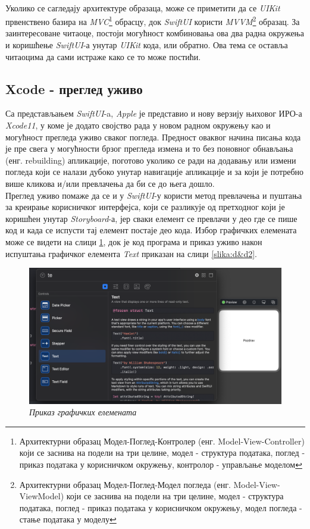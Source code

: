 \documentclass[12pt,oneside]{memoir}
\begin{document}
\\
\indent Уколико се сагледају архитектуре образаца, може се приметити да се \textit{UIKit} првенствено базира на \textit{MVC}\footnote{Архитектурни образац Модел-Поглед-Контролер (енг. Model-View-Controller) који се заснива на подели на три целине, модел - структура података, поглед - приказ података у корисничком окружењу, контролор - управљање моделом} обрасцу, док \textit{SwiftUI} користи \textit{MVVM}\footnote{Архитектурни образац Модел-Поглед-Модел погледа (енг. Model-View-ViewModel) који се заснива на подели на три целине, модел - структура података, поглед - приказ података у корисничком окружењу, модел погледа - стање података у моделу} образац. За заинтересоване читаоце, постоји могућност комбиновања ова два радна окружења и коришћење \textit{SwiftUI}-а унутар \textit{UIKit} кода, или обратно. Ова тема се оставља читаоцима да сами истраже како се то може постићи.

\subsection{Xcode - преглед уживо}
\label{subsec:Xcode - преглед уживо}

\indent Са представљањем \textit{SwiftUI}-a, \textit{Apple} је представио и нову верзију њиховог ИРО-а \textit{Xcode11}, у коме је додато својство рада у новом радном окружењу као и могућност прегледа уживо сваког погледа. Предност оваквог начина писања кода је пре свега у могућности брзог прегледа измена и то без поновног обнављања (енг. rebuilding) апликације, поготово уколико се ради на додавању или измени погледа који се налази дубоко унутар навигације апликације и за који је потребно више кликова и/или превлачења да би се до њега дошло. 
\\
\indent Преглед уживо помаже да се и у \textit{SwiftUI}-у користи метод превлачења и пуштања за креирање корисничког интерфејса, који се разликује од претходног који је коришћен унутар \textit{Storyboard}-а, јер сваки елемент се превлачи у део где се пише код и када се испусти тај елемент постаје део кода. Избор графичких елемената може се видети на слици \ref{slika:d&d1}, док је код програма и приказ уживо након испуштања графичког елемента \textit{Text} приказан на слици \ref{slika:d&d2}.

\begin{figure}[H]
\includegraphics[width=1\textwidth]{images/Drag_and_drop_1.png}
\centering
\caption{\textit{Приказ графичких елемената}}
\label{slika:d&d1}
\end{figure}
\end{document}
